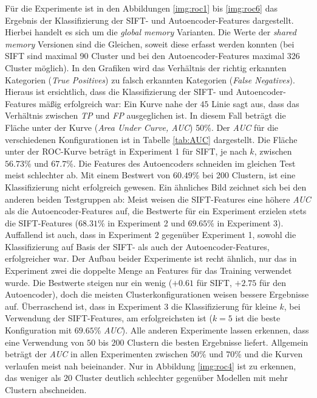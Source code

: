Für die Experimente ist in den Abbildungen \ref{img:roc1} bis \ref{img:roc6} das Ergebnis der Klassifizierung der SIFT- und Autoencoder-Features dargestellt. Hierbei handelt es sich um die \textit{global memory} Varianten. Die Werte der \textit{shared memory} Versionen sind die Gleichen, soweit diese erfasst werden konnten (bei SIFT sind maximal 90 Cluster und bei den Autoencoder-Features maximal 326 Cluster möglich). In den Grafiken wird das Verhältnis der richtig erkannten Kategorien (\textit{True Positives}) zu falsch erkannten Kategorien (\textit{False Negatives}). Hieraus ist ersichtlich, dass die Klassifizierung der SIFT- und Autoencoder-Features mäßig erfolgreich war: Ein Kurve nahe der $45${\degree} Linie sagt aus, dass das Verhältnis zwischen \textit{TP} und \textit{FP} ausgeglichen ist. In diesem Fall beträgt die Fläche unter der Kurve (\textit{Area Under Curve, AUC}) 50\%. Der \textit{AUC} für die verschiedenen Konfigurationen ist in Tabelle \ref{tab:AUC} dargestellt. Die Fläche unter der ROC-Kurve beträgt in Experiment 1 für SIFT, je nach $k$, zwischen $56.73$\% und $67.7$\%. Die Features des Autoencoders schneiden im gleichen Test meist schlechter ab. Mit einem Bestwert von $60.49$\% bei 200 Clustern, ist eine Klassifizierung nicht erfolgreich gewesen.\newline
Ein ähnliches Bild zeichnet sich bei den anderen beiden Testgruppen ab: Meist weisen die SIFT-Features eine höhere \textit{AUC} als die Autoencoder-Features auf, die Bestwerte für ein Experiment erzielen stets die SIFT-Features ($68.31$\% in Experiment 2 und $69.65$\% in Experiment 3).\newline
Auffallend ist auch, dass in Experiment 2 gegenüber Experiment 1, sowohl die Klassifizierung auf Basis der SIFT- als auch der Autoencoder-Features, erfolgreicher war. Der Aufbau beider Experimente ist recht ähnlich, nur das in Experiment zwei die doppelte Menge an Features für das Training verwendet wurde. Die Bestwerte steigen nur ein wenig ($+0.61$ für SIFT, $+2.75$ für den Autoencoder), doch die meisten Clusterkonfigurationen weisen bessere Ergebnisse auf.\newline
Überraschend ist, dass in Experiment 3 die Klassifizierung für kleine $k$, bei Verwendung der SIFT-Features, am erfolgreichsten ist ($k=5$ ist die beste Konfiguration mit $69.65$\% \textit{AUC}). Alle anderen Experimente lassen erkennen, dass eine Verwendung von $50$ bis $200$ Clustern die besten Ergebnisse liefert.\newline
Allgemein beträgt der  \textit{AUC} in allen Experimenten zwischen $50$\% und $70$\% und die Kurven verlaufen meist nah beieinander. Nur in Abbildung \ref{img:roc4} ist zu erkennen, das weniger als $20$ Cluster deutlich schlechter gegenüber Modellen mit mehr Clustern abschneiden. 

